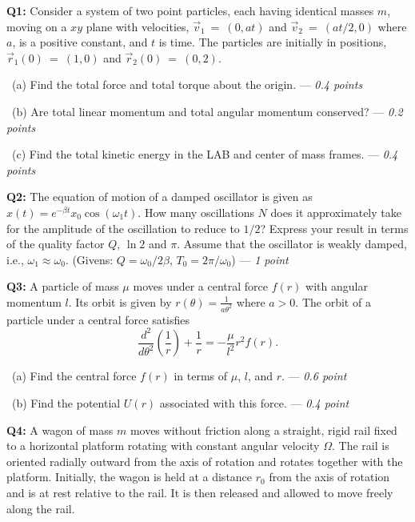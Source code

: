\documentclass[a4paper,12pt]{article}
\begin{document}
\textbf{Q1:} Consider a system of two point particles, each having identical masses $m$, moving on a $xy$ plane with velocities, $\vec v_{1}~=~(0,at)$ and $\vec v_{2}~=~(at/2,0)$ where $a$, is a positive constant, and $t$ is time. The particles are initially in positions, $\vec r_{1}(0)~=~(1,0)$ and $\vec r_{2}(0)~=~(0,2)$.

\vspace*{0.1cm}
~(a) Find the total force and total torque about the origin. --- \textit{0.4 points}

~(b) Are total linear momentum and total angular momentum conserved? --- \textit{0.2 points}

~(c) Find the total kinetic energy in the LAB and center of mass frames. --- \textit{0.4 points}

\vspace*{0.25cm}
\textbf{Q2:} The equation of motion of a damped oscillator is given as $x(t)=e^{-\beta t}x_0\cos{\left(\omega_1 t\right)}$. How many oscillations $N$ does it approximately take for the amplitude of the oscillation to reduce to $1/2$? Express your result in terms of the quality factor $Q$, $\ln 2$ and $\pi$. Assume that the oscillator is weakly damped, i.e., $\omega_1 \approx \omega_0$.
(Givens: $Q = \omega_0/2\beta$, $T_0=2\pi/\omega_0$) --- \textit{1 point}

\vspace*{0.25cm}
\textbf{Q3:} A particle of mass $\mu$ moves under a central force $f(r)$ with angular momentum $l$. Its orbit is given by $r(\theta) = \frac{1}{a \theta^2}$ where $a > 0$. The orbit of a particle under a central force satisfies
\[
\frac{d^2}{d\theta^2}\left(\frac{1}{r}\right) + \frac{1}{r} = -\frac{\mu}{l^2} r^2 f(r).
\]

\vspace*{0.1cm}
~(a) Find the central force $f(r)$ in terms of $\mu$, $l$, and $r$. --- \textit{0.6 point}

~(b) Find the potential $U(r)$ associated with this force. --- \textit{0.4 point}

\vspace*{0.25cm}
\textbf{Q4:} A wagon of mass $m$ moves without friction along a straight, rigid rail fixed to a horizontal platform rotating with constant angular velocity $\Omega$.  
The rail is oriented radially outward from the axis of rotation and rotates together with the platform. Initially, the wagon is held at a distance $r_0$ from the axis of rotation and is at rest relative to the rail. It is then released and allowed to move freely along the rail.
\end{document}
